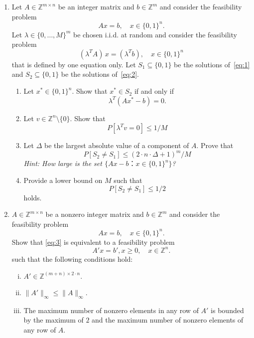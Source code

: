 \documentclass[11pt,a4paper]{article}
\begin{document}
\begin{enumerate}
  
\item Let $A ∈ ℤ^{ m ×n}$ be an integer matrix and $b ∈ ℤ^m$ and consider the feasibility problem 
  \begin{equation}
    \label{eq:1}
    Ax = b, \quad x ∈ \{0,1\}^n.  
  \end{equation}
  Let $λ ∈ \{0,\dots,M\}^m$ be chosen i.i.d. at random and consider the feasibility problem 
  \begin{equation}
    \label{eq:2}
    (λ^TA)\,  x = (λ^Tb), \quad x ∈ \{0,1\}^n 
  \end{equation}
  that is defined by one equation only. Let $S_1 ⊆ \{0,1\}$ be the solutions of~\eqref{eq:1} and $S_2 ⊆ \{0,1\}$ be the solutions of~\eqref{eq:2}.
  \begin{enumerate}
  \item Let $x^* ∈ \{0,1\}^n$. Show that $x^* ∈ S_2$ if and only if
    \begin{displaymath}
      λ^T (A x^* - b) = 0.
    \end{displaymath}
  \item Let $v ∈ℤ^n \setminus \{0\}$. Show that
    \begin{displaymath}
      P\left[ λ^T v = 0\right] ≤ 1/M 
    \end{displaymath}  
  \item Let $Δ$ be the largest absolute value of a component of $A$.  Prove that
    \begin{displaymath}
      P \left[ S_2 ≠ S_1\right] ≤ (2 ⋅ n ⋅ Δ +1)^m / M
    \end{displaymath}
\hfill     \emph{Hint: How large is the set $\{Ax - b ： x ∈ \{0,1\}^n \}$?} 
  \item Provide a lower bound on $M$ such that
     \begin{displaymath}
      P \left[ S_2 ≠ S_1\right] ≤  1/2
    \end{displaymath}
    holds. 
  \end{enumerate}
\item $A ∈ ℤ^{ m ×n}$ be a nonzero integer matrix and $b ∈ ℤ^m$ and consider the feasibility problem 
  \begin{equation} 
    \label{eq:3}
    Ax = b, \quad x ∈ \{0,1\}^n.  
  \end{equation}
  Show that \eqref{eq:3} is equivalent to a feasibility problem
  \begin{displaymath}
    A'x = b', x≥0, \quad x ∈ ℤ^n.    
  \end{displaymath}
  such that the following conditions hold:
  \begin{enumerate}[i)] 
  \item $A' ∈ℤ^{ (m+n) ×2⋅n}$. 
  \item $\|A' \|_∞ ≤  \|A\|_∞$.
  \item The maximum number of nonzero elements in any row of $A'$ is
    bounded by the maximum of $2$ and the maximum number of nonzero
    elements of any row of $A$.
  \end{enumerate}


\end{enumerate}
\end{document}
